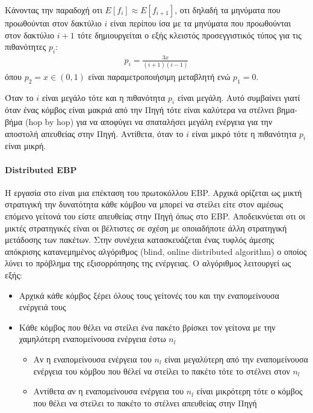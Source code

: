 Κάνοντας την παραδοχή οτι $E[f_{i}] \approx E[f_{i+1}]$, οτι δηλαδή τα μηνύματα που προωθούνται στον δακτύλιο $i$ είναι περίπου ίσα με τα μηνύματα που προωθούνται
στον δακτύλιο $i+1$ τότε δημιουργείται ο εξής κλειστός προσεγγιστικός τύπος για τις πιθανότητες $p_{i}$:
\begin{align*}
p_{i} = \frac{3x}{(i+1)(i-1)}
\end{align*}
όπου $p_{2} = x \in (0,1)$ είναι παραμετροποιήσιμη μεταβλητή ενώ $p_{1} =0$.

Όταν το $i$ είναι μεγάλο τότε και η πιθανότητα $p_{i}$ είναι μεγάλη. Αυτό συμβαίνει γιατί όταν ένας κόμβος είναι μακριά από την Πηγή τότε είναι
καλύτερα να στέλνει βημα-βήμα (hop by hop) για να αποφύγει να σπαταλήσει μεγάλη ενέργεια για την αποστολή απευθείας στην Πηγή. Αντίθετα, όταν το $i$ είναι μικρό τότε
η πιθανότητα $p_{i}$ είναι μικρή.

\paragraph{Distributed EBP} Η εργασία στο \cite{debp_protocol} είναι μια επέκταση του πρωτοκόλλου EBP. Αρχικά
ορίζεται ως μικτή στρατιγική την δυνατότητα κάθε κόμβου να μπορεί να στείλει είτε στον αμέσως επόμενο γείτονά του είστε απευθείας στην Πηγή όπως στο EBP.
Αποδεικνύεται οτι οι μικτές στρατηγικές είναι οι βέλτιστες σε σχέση με οποιαδήποτε άλλη στρατηγική μετάδοσης των πακέτων. Στην συνέχεια κατασκευάζεται ένας τυφλός
άμεσης απόκρισης κατανεμημένος αλγόριθμος (blind, online distributed algorithm) ο οποίος λύνει το πρόβλημα της εξισορρόπησης της ενέργειας. Ο αλγόριθμος λειτουργεί ως
εξής:
\begin{itemize}
\item Αρχικά κάθε κόμβος ξέρει όλους τους γείτονές του και την εναπομείνουσα ενέργειά τους
\item Κάθε κόμβος που θέλει να στείλει ένα πακέτο βρίσκει τον γείτονα με την χαμηλότερη εναπομείνουσα ενέργεια έστω $n_{l}$
	\begin{itemize}
	\item Αν η εναπομείνουσα ενέργεια του $n_{l}$ είναι μεγαλύτερη από την εναπομείνουσα ενέργεια του κόμβου που θέλεί να στείλει το πακέτο τότε το στέλνει στον
$n_{l}$
	\item Αντίθετα αν η εναπομείνουσα ενέργεια του $n_{l}$ είναι μικρότερη τότε ο κόμβος που θέλει να στείλει το πακέτο το στέλνει απευθείας στην Πηγή
	\end{itemize}
\end{itemize}

